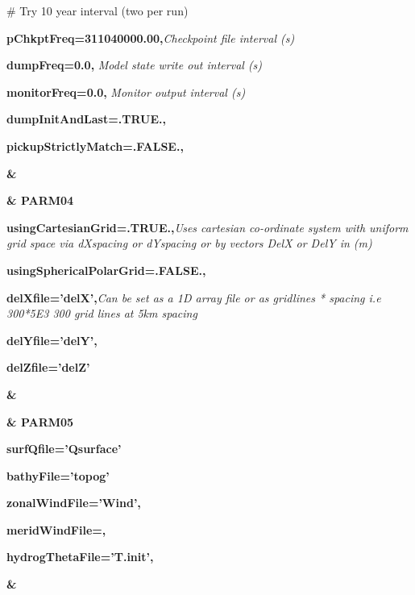 {\# Try 10 year interval (two per run)

\textbf{pChkptFreq=311040000.00,}\textit{Checkpoint file interval (s)}

\textbf{dumpFreq=0.0,} \textit{Model state write out interval (s)}
 
\textbf{monitorFreq=0.0,} \textit{Monitor output interval (s)}

\textbf{dumpInitAndLast=.TRUE.,}

\textbf{pickupStrictlyMatch=.FALSE.,}

\textbf{\&}

\textbf{\& PARM04}

\textbf{usingCartesianGrid=.TRUE.,}\textit{Uses cartesian co-ordinate system with uniform grid space via dXspacing or dYspacing or by vectors DelX or DelY in (m)}

\textbf{usingSphericalPolarGrid=.FALSE.,}

\textbf{delXfile='delX',}\textit{Can be set as a 1D array file or as gridlines * spacing i.e 300*5E3 300 grid lines at 5km spacing}

\textbf{delYfile='delY',}

\textbf{delZfile='delZ'}

\textbf{\&}

\textbf{\& PARM05}

\textbf{surfQfile='Qsurface'}

\textbf{bathyFile='topog'}

\textbf{zonalWindFile='Wind',}

\textbf{meridWindFile=,}

\textbf{hydrogThetaFile='T.init',}

\textbf{\&}
}